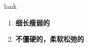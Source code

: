
\begin{frame}
{\huge lank}
\begin{center}
\begin{enumerate}\Large
  \item \textbf{细长瘦弱的}
  \item \textbf{不僵硬的，柔软松弛的}
\end{enumerate}
\end{center}
\end{frame}
